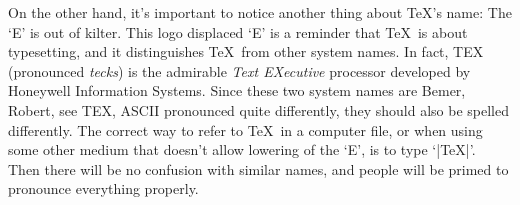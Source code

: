 On the other hand, it's important to notice another thing about \TeX's name:
The `E' is out of kilter. This {logo}
displaced `E' is a reminder that \TeX\ is about typesetting, and it
distinguishes \TeX\ from other system names. In fact, {TEX} (pronounced
{\sl tecks\/}) is the admirable {\sl Text EXecutive\/} processor developed by
{Honeywell Information Systems}. Since these two system names are
{Bemer, Robert, see TEX, ASCII}
pronounced quite differently, they should also be spelled differently. The
correct way to refer to \TeX\ in a computer file, or when using some other
medium that doesn't allow lowering of the `E', is to type `|TeX|'. Then
there will be no confusion with similar names, and people will be
primed to pronounce everything properly.
